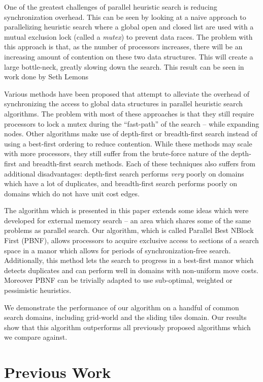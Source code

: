 \documentclass{article}
\begin{document}
One of the greatest challenges of parallel heuristic search is
reducing synchronization overhead.  This can be seen by looking at a
naive approach to parallelizing heuristic search where a global open
and closed list are used with a mutual exclusion lock (called a
\emph{mutex}) to prevent data races.  The problem with this approach
is that, as the number of processors increases, there will be an
increasing amount of contention on these two data structures.  This
will create a large bottle-neck, greatly slowing down the search.
This result can be seen in work done by Seth Lemons \cite{lemons:sur}

Various methods have been proposed that attempt to alleviate the
overhead of synchronizing the access to global data structures in
parallel heuristic search algorithms.  The problem with most of these
approaches is that they still require processors to lock a mutex
during the ``fast-path'' of the search -- while expanding nodes.
Other algorithms make use of depth-first or breadth-first search
instead of using a best-first ordering to reduce contention.  While
these methods may scale with more processors, they still suffer from
the brute-force nature of the depth-first and breadth-first search
methods.  Each of these techniques also suffers from additional
disadvantages: depth-first search performs \emph{very} poorly on
domains which have a lot of duplicates, and breadth-first search
performs poorly on domains which do not have unit cost edges.

The algorithm which is presented in this paper extends some ideas
which were developed for external memory search -- an area which
shares some of the same problems as parallel search.  Our algorithm,
which is called Parallel Best NBlock First (PBNF), allows processors
to acquire exclusive access to sections of a search space in a manor
which allows for periods of synchronization-free search.
Additionally, this method lets the search to progress in a best-first
manor which detects duplicates and can perform well in domains with
non-uniform move costs.  Moreover PBNF can be trivially adapted to use
sub-optimal, weighted or pessimistic heuristics.

We demonstrate the performance of our algorithm on a handful of common
search domains, including grid-world and the sliding tiles domain.
Our results show that this algorithm outperforms all previously
proposed algorithms which we compare against.

\section{Previous Work}
\end{document}
